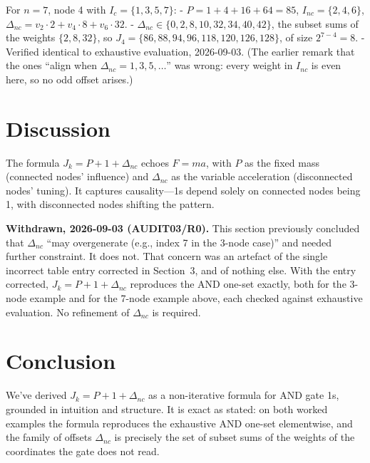 \documentclass[12pt]{article}
\begin{document}
For \( n = 7 \), node 4 with \( I_c = \{1, 3, 5, 7\} \):
- \( P = 1 + 4 + 16 + 64 = 85 \), \( I_{nc} = \{2, 4, 6\} \), \( \Delta_{nc} = v_2 \cdot 2 + v_4 \cdot 8 + v_6 \cdot 32 \).
- \( \Delta_{nc} \in \{0,2,8,10,32,34,40,42\} \), the subset sums of the weights
  \( \{2,8,32\} \), so
  \( J_4 = \{86, 88, 94, 96, 118, 120, 126, 128\} \), of size \( 2^{7-4} = 8 \).
- Verified identical to exhaustive evaluation, 2026-09-03. (The earlier remark
  that the ones ``align when \( \Delta_{nc} = 1, 3, 5, \dots \)'' was wrong:
  every weight in \( I_{nc} \) is even here, so no odd offset arises.)

\section{Discussion}
The formula \( J_k = P + 1 + \Delta_{nc} \) echoes \( F = ma \), with \( P \) as the fixed mass (connected nodes’ influence) and \( \Delta_{nc} \) as the variable acceleration (disconnected nodes’ tuning). It captures causality—1s depend solely on connected nodes being 1, with disconnected nodes shifting the pattern.

\medskip
\noindent\textbf{Withdrawn, 2026-09-03 (AUDIT03/R0).} This section previously
concluded that \( \Delta_{nc} \) ``may overgenerate (e.g., index 7 in the 3-node
case)'' and needed further constraint. It does not. That concern was an artefact
of the single incorrect table entry corrected in Section~3, and of nothing else.
With the entry corrected, \( J_k = P + 1 + \Delta_{nc} \) reproduces the AND
one-set exactly, both for the 3-node example and for the 7-node example above,
each checked against exhaustive evaluation. No refinement of \( \Delta_{nc} \) is
required.

\section{Conclusion}
We’ve derived \( J_k = P + 1 + \Delta_{nc} \) as a non-iterative formula for AND gate 1s, grounded in intuition and structure. It is exact as stated: on both worked examples the formula reproduces the exhaustive AND one-set elementwise, and the family of offsets \( \Delta_{nc} \) is precisely the set of subset sums of the weights of the coordinates the gate does not read.
\end{document}
